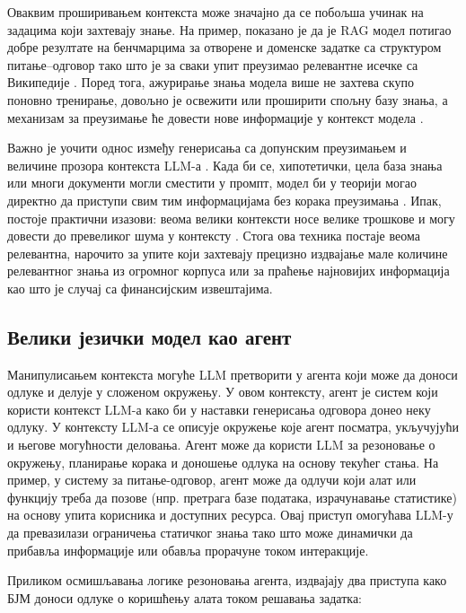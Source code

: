 Оваквим проширивањем контекста може значајно да се побољша учинак на задацима који захтевају знање. На пример, показано је да је RAG модел потигао добре резултате на бенчмарцима за отворене и доменске задатке са структуром питање--одговор тако што је за сваки упит преузимао релевантне исечке са Википедије \cite{lewis_retrieval_2020,yang_dual_2025}. Поред тога, ажурирање знања модела више не захтева скупо поновно тренирање, довољно је освежити или проширити спољну базу знања, а механизам за преузимање ће довести нове информације у контекст модела \cite{lewis_retrieval_2020}.
\newline

Важно је уочити однос између генерисања са допунским преузимањем и величине прозора контекста LLM-а \cite{kim_large_2024}. Када би се, хипотетички, цела база знања или многи документи могли сместити у промпт, модел би у теорији могао директно да приступи свим тим информацијама без корака преузимања \cite{kim_large_2024}. Ипак, постоје практични изазови: веома велики контексти носе велике трошкове и могу довести до превеликог шума у контексту \cite{liu_lost_2023,kim_large_2024}. Стога ова техника постаје веома релевантна, нарочито за упите који захтевају прецизно издвајање мале количине релевантног знања из огромног корпуса или за праћење најновијих информација као што је случај са финансијским извештајима.

\subsection{Велики језички модел као агент}

Манипулисањем контекста могуће LLM претворити у агента који може да доноси одлуке и делује у сложеном окружењу. У овом контексту, агент је систем који користи контекст LLM-а како би у наставки генерисања одговора донео неку одлуку. У контексту LLM-а се описује окружење које агент посматра, укључујући и његове могућности деловања. Агент може да користи LLM за резоновање о окружењу, планирање корака и доношење одлука на основу текућег стања. На пример, у систему за питање-одговор, агент може да одлучи који алат или функцију треба да позове (нпр. претрага базе података, израчунавање статистике) на основу упита корисника и доступних ресурса. Овај приступ омогућава LLM-у да превазилази ограничења статичког знања тако што може динамички да прибавља информације или обавља прорачуне током интеракције.
\newline

Приликом осмишљавања логике резоновања агента, издвајају два приступа како БЈМ доноси одлуке о коришћењу алата током решавања задатка: 

